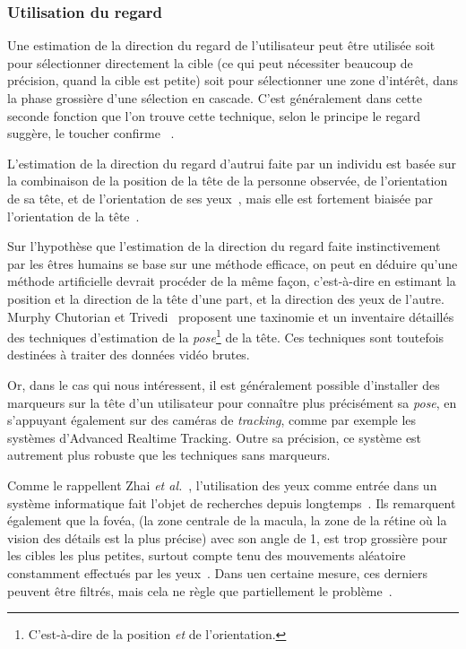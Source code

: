 	\subsubsection{Utilisation du regard}
	Une estimation de la direction du regard de l'utilisateur peut être utilisée soit pour sélectionner directement la cible (ce qui peut nécessiter beaucoup de précision, quand la cible est petite) soit pour sélectionner une zone d'intérêt, dans la phase grossière d'une sélection en cascade. C'est généralement dans cette seconde fonction que l'on trouve cette technique, selon le principe \og le regard suggère, le toucher confirme \fg{}~\cite{stellmach2012look}.

	L'estimation de la direction du regard d'autrui faite par un individu est basée sur la combinaison de la position de la tête de la personne observée, de l'orientation de sa tête, et de l'orientation de ses yeux~\cite{langton2004influence}, mais elle est fortement biaisée par l'orientation de la tête~\cite{wollaston1824apparent}.
	
	Sur l'hypothèse que l'estimation de la direction du regard faite instinctivement par les êtres humains se base sur une méthode efficace, on peut en déduire qu'une méthode artificielle devrait procéder de la même façon, c'est-à-dire en estimant la position et la direction de la tête d'une part, et la direction des yeux de l'autre. Murphy Chutorian et Trivedi~\cite{murphy2009head} proposent une taxinomie et un inventaire détaillés des techniques d'estimation de la \emph{pose}\footnote{C'est-à-dire de la position \emph{et} de l'orientation.} de la tête. Ces techniques sont toutefois destinées à traiter des données vidéo brutes.
	
	Or, dans le cas qui nous intéressent, il est généralement possible d'installer des marqueurs sur la tête d'un utilisateur pour connaître plus précisément sa \emph{pose}, en s'appuyant également sur des caméras de \emph{tracking}, comme par exemple les systèmes d'Advanced Realtime Tracking\footnotemark{}. Outre sa précision, ce système est autrement plus robuste que les techniques sans marqueurs.
	
	
	Comme le rappellent Zhai \emph{et al.}~\cite{zhai1999manual}, l'utilisation des yeux comme entrée dans un système informatique fait l'objet de recherches depuis longtemps~\cite{levine1981eye, bolt1982eyes, ware1987evaluation, jacob1990you}. Ils remarquent également que la fovéa, (la zone centrale de la macula, la zone de la rétine où la vision des détails est la plus précise) avec son angle de 1\textdegree{}, est trop grossière pour les cibles les plus petites, surtout compte tenu des mouvements aléatoire constamment effectués par les yeux~\cite{monden2005evaluation, vspakov2011comparison}. Dans uen certaine mesure, ces derniers peuvent être filtrés, mais cela ne règle que partiellement le problème~\cite{zhang2008improving}.
	
